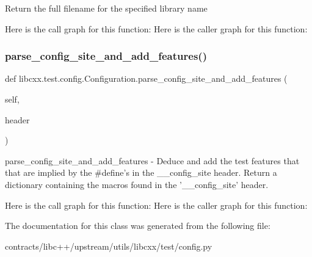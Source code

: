 \begin{DoxyVerb}Return the full filename for the specified library name\end{DoxyVerb}
 Here is the call graph for this function\+:
Here is the caller graph for this function\+:
\mbox{\label{classlibcxx_1_1test_1_1config_1_1_configuration_a98e4c6f60edb18c1aa8afc4fd130422f}} 
\subsubsection{\texorpdfstring{parse\+\_\+config\+\_\+site\+\_\+and\+\_\+add\+\_\+features()}{parse\_config\_site\_and\_add\_features()}}
{\footnotesize\ttfamily def libcxx.\+test.\+config.\+Configuration.\+parse\+\_\+config\+\_\+site\+\_\+and\+\_\+add\+\_\+features (\begin{DoxyParamCaption}\item[{}]{self,  }\item[{}]{header }\end{DoxyParamCaption})}

\begin{DoxyVerb}parse_config_site_and_add_features - Deduce and add the test
    features that that are implied by the #define's in the __config_site
    header. Return a dictionary containing the macros found in the
    '__config_site' header.
\end{DoxyVerb}
 Here is the call graph for this function\+:
Here is the caller graph for this function\+:


The documentation for this class was generated from the following file\+:\begin{DoxyCompactItemize}
\item 
contracts/libc++/upstream/utils/libcxx/test/config.\+py\end{DoxyCompactItemize}
